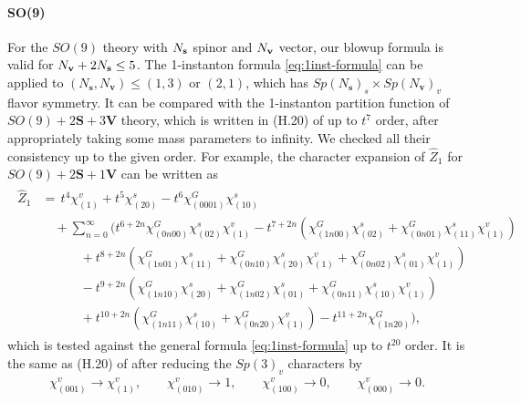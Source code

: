 \documentclass[letterpaper, 11pt]{article}
\begin{document}
{\paragraph{SO(9)}
For the $SO(9)$ theory with $N_{\bf s}$ spinor and $N_{\bf v}$ vector, our blowup formula is valid for $N_{\bf v} + 2 N_{\bf s} \le 5$. 
The 1-instanton formula \eqref{eq:1inst-formula} can be applied to $(N_\mathbf{s}, N_{\mathbf{v}}) \leq (1,3)$ or $(2,1)$, which has $Sp(N_\mathbf{s})_s \times Sp(N_\mathbf{v})_v$ flavor symmetry. It can be compared with the 1-instanton partition function of $SO(9) + 2\mathbf{S} + 3\mathbf{V}$ theory, which is written in (H.20) of \cite{DelZotto:2018tcj} up to $t^7$ order, after appropriately taking some mass parameters to infinity. We checked all their consistency up to the given order. For example, the character expansion of $\hat{Z}_{1}$ for $SO(9) + 2\mathbf{S} + 1\mathbf{V}$  can be written as  
\begin{align}
  \label{eq:SO9-v1s2}
  \begin{split}
  \hat{Z}_1&=\, t^4\chi^v_{(1)}+t^5\chi^s_{(20)}-t^6\chi_{(0001)}^G\chi^s_{(10)}
   \\&\quad +\sum_{n=0}^{\infty}\Bigg(t^{6+2n}\chi^G_{(0n00)}\chi^s_{(02)}\chi^v_{(1)}
  -t^{7+2n}\left(\chi^G_{(1n00)}\chi^s_{(02)}+\chi^G_{(0n01)}\chi^s_{(11)}\chi^v_{(1)}\right) 
  \\&\qquad \quad+t^{8+2n}\left(\chi^G_{(1n01)}\chi^s_{(11)}+\chi^G_{(0n10)}\chi^s_{(20)}\chi^v_{(1)} 
  +\chi^G_{(0n02)}\chi^s_{(01)}\chi^v_{(1)}\right)
  \\&\qquad \quad-t^{9+2n}\left(\chi^G_{(1n10)}\chi^s_{(20)}+\chi^G_{(1n02)}\chi^s_{(01)}+\chi^G_{(0n11)}\chi^s_{(10)}\chi^v_{(1)}\right)\\
  &\qquad \quad+t^{10+2n}\left(\chi^G_{(1n11)}\chi^s_{(10)}+\chi^G_{(0n20)}\chi^v_{(1)}\right) -t^{11+2n}\chi^G_{(1n20)} \Bigg),
  \end{split}
  \end{align}
which is tested against the general formula \eqref{eq:1inst-formula} up to $t^{20}$ order. It is the same as (H.20) of \cite{DelZotto:2018tcj} after reducing the $Sp(3)_v$ characters by 
\begin{align}
  \chi^{v}_{(001)}\rightarrow \chi^{v}_{(1)},\qquad \chi^{v}_{(010)}\rightarrow 1,\qquad \chi^{v}_{(100)}\rightarrow 0,\qquad\chi^{v}_{(000)}\rightarrow 0.
\end{align}



}
\end{document}

